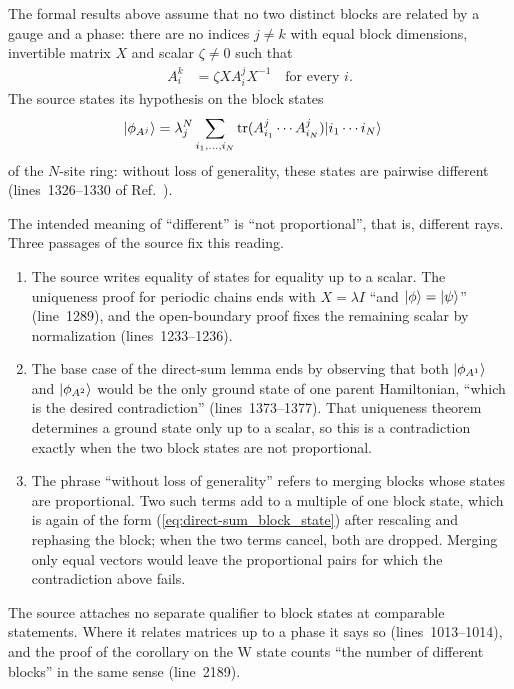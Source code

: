 \documentclass{article}
\begin{document}
The formal results above assume that no two distinct blocks are related by a
gauge and a phase: there are no indices $j\ne k$ with equal block dimensions,
invertible matrix $X$ and scalar $\zeta\ne0$ such that
\begin{align}
    A^k_i
     & =\zeta XA^j_iX^{-1}
    \quad\text{for every }i.
    \label{eq:direct-sum_gauge_phase_relation}
\end{align}
The source states its hypothesis on the block states
\begin{align}
    |\phi_{A^j}\rangle
     & =\lambda_j^N\sum_{i_1,\ldots,i_N}
    \operatorname{tr}(A^j_{i_1}\cdots A^j_{i_N})|i_1\cdots i_N\rangle
    \label{eq:direct-sum_block_state}
\end{align}
of the $N$-site ring: without loss of generality, these states are pairwise
different (lines~1326--1330 of Ref.~\cite{PerezGarcia2007MPSReps}).

The intended meaning of ``different'' is ``not proportional'', that is,
different rays. Three passages of the source fix this reading.
\begin{enumerate}
    \item The source writes equality of states for equality up to a scalar.
          The uniqueness proof for periodic chains ends with
          $X=\lambda I$ ``and $|\phi\rangle=|\psi\rangle$'' (line~1289), and the
          open-boundary proof fixes the remaining scalar by normalization
          (lines~1233--1236).
    \item The base case of the direct-sum lemma ends by observing that both
          $|\phi_{A^1}\rangle$ and $|\phi_{A^2}\rangle$ would be the only ground
          state of one parent Hamiltonian, ``which is the desired
          contradiction'' (lines~1373--1377). That uniqueness theorem determines
          a ground state only up to a scalar, so this is a contradiction exactly
          when the two block states are not proportional.
    \item The phrase ``without loss of generality'' refers to merging blocks
          whose states are proportional. Two such terms add to a multiple of
          one block state, which is again of the form
          (\ref{eq:direct-sum_block_state}) after rescaling and rephasing the
          block; when the two terms cancel, both are dropped. Merging only
          equal vectors would leave the proportional pairs for which the
          contradiction above fails.
\end{enumerate}
The source attaches no separate qualifier to block states at comparable
statements. Where it relates matrices up to a phase it says so
(lines~1013--1014), and the proof of the corollary on the W state counts
``the number of different blocks'' in the same sense (line~2189).
\end{document}
